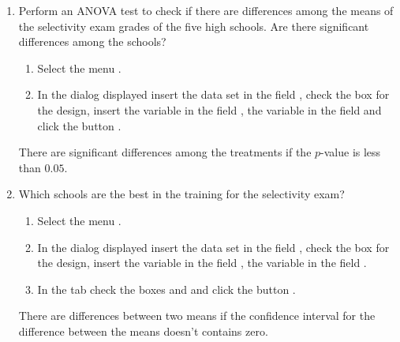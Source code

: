 \begin {enumerate}[leftmargin=*]
\begin{enumerate}
\item Perform an ANOVA test to check if there are differences among the means of the selectivity exam grades of the five
high schools.
Are there significant differences among the schools?
\begin{indication}
\begin{enumerate}
\item Select the menu .
\item In the dialog displayed insert the data set  in the field , check the box
 for the design, insert the variable  in the field , the variable  in the field  and click
the button .
\end{enumerate}
There are significant differences among the treatments if the $p$-value is less than $0.05$.
\end{indication}

\item Which schools are the best in the training for the selectivity exam?
\begin{indication}
\begin{enumerate}
\item Select the menu .
\item In the dialog displayed insert the data set  in the field , check the box
 for the design, insert the variable  in the field , the variable  in the field .
\item In the  tab check the boxes  and  and click the button .
\end{enumerate}
There are differences between two means if the confidence interval for the difference between the means doesn't contains
zero.
\end{indication}
\end{enumerate}
\end{enumerate}


